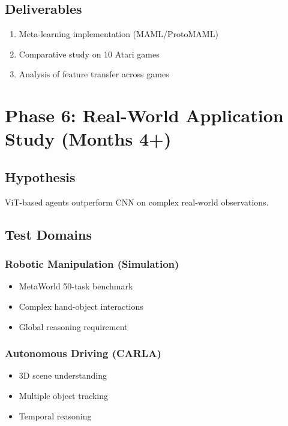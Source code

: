 \documentclass[12pt,a4paper,openany]{report}
\begin{document}
\subsection{Deliverables}

\begin{enumerate}
    \item Meta-learning implementation (MAML/ProtoMAML)
    \item Comparative study on 10 Atari games
    \item Analysis of feature transfer across games
\end{enumerate}

\section{Phase 6: Real-World Application Study (Months 4+)}

\subsection{Hypothesis}

ViT-based agents outperform CNN on complex real-world observations.

\subsection{Test Domains}

\subsubsection{Robotic Manipulation (Simulation)}

\begin{itemize}
    \item MetaWorld 50-task benchmark
    \item Complex hand-object interactions
    \item Global reasoning requirement
\end{itemize}

\subsubsection{Autonomous Driving (CARLA)}

\begin{itemize}
    \item 3D scene understanding
    \item Multiple object tracking
    \item Temporal reasoning
\end{itemize}
\end{document}
